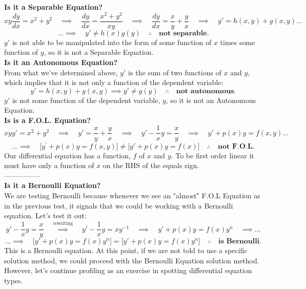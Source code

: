 \documentclass[a4paper,12pt]{article} %
\begin{document}
 
 \textbf{Is it a Separable Equation?}
 $$ xy\frac{dy}{dx} = x^2 + y^2 \quad\implies \quad \frac{dy}{dx} = \frac{x^2 + y^2}{xy} \quad\implies \quad \frac{dy}{dx} = \frac{x}{y} + \frac{y}{x} \quad\implies\quad y' = h(x,y) + g(x,y)\ldots $$
 $$ \ldots\implies \quad \boxed{y' \neq h(x)g(y) \quad\therefore\quad \textbf{not separable.}} $$
 $y'$ is not able to be manipulated into the form of some function of $x$ times some function of $y$, so it is not a Separable Equation.\\
 
 \textbf{Is it an Autonomous Equation?}\\
 
 From what we've determined above, $y'$ is the sum of two functions of $x$ and $y$, which implies that it is not only a function of the dependent variable:
 $$ y' = h(x,y) + g(x,y) \implies \boxed{y' \neq g(y) \quad\therefore\quad \textbf{not autonomous.}}$$
 $y'$ is not some function of the dependent variable, $y$, so it is not an Autonomous Equation.\\
 
 \textbf{Is is a F.O.L. Equation?}
 $$ xyy' = x^2 + y^2 \quad\implies \quad y' = \frac{x}{y} + \frac{y}{x} \quad\implies \quad y' - \frac{1}{x}y = \frac{x}{y} \quad\implies\quad y' + p(x)y = f(x,y)\ldots $$
 $$\ldots\implies \quad \boxed{\bigg[y^{\prime}+p(x)y=f(x, y)\bigg] \neq \bigg[y' + p(x)y = f(x)\bigg] \quad\therefore\quad \textbf{not F.O.L.}} $$
 Our differential equation has a function, $f$ of $x$ and $y$. To be first order linear it must have only a function of $x$ on the RHS of the equals sign.\\
 
 ---------------\\
 
 \textbf{Is it a Bernoulli Equation?}\\
 
 We are testing Bernoulli because whenever we see an "almost" F.O.L Equation as in the previous test, it signals that we could be working with a Bernoulli equation. Let's test it out:
 $$ y' - \frac{1}{x}y = \frac{x}{y} \quad\overset{\text{rewriting}}\implies \quad y' - \frac{1}{x}y = xy^{-1} \quad\implies\quad y' + p(x)y = f(x)y^n \quad\implies \ldots $$
 $$ \ldots\implies \quad \boxed{\bigg[y' + p(x)y = f(x)y^n\bigg] = \bigg[y' + p(x)y = f(x)y^n\bigg] \quad\therefore\quad \textbf{is Bernoulli.}}$$
 This is a Bernoulli equation. At this point, if we are not told to use a specific solution method, we could proceed with the Bernoulli Equation solution method. However, let's continue profiling as an exercise in spotting differential equation types.\\
 
\end{document}
